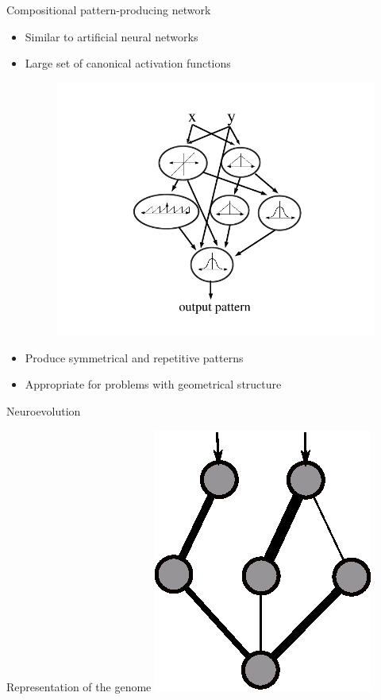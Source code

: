 \documentclass[6pt]{beamer}
\begin{document}
\begin{frame}{Compositional pattern-producing network~}
\begin{itemize}
\item Similar to artificial neural networks
\item Large set of canonical activation functions
\begin{figure}
\begin{center}
\includegraphics[scale=0.25]{../Figures/Misc/cppnNetwork.png}
\end{center}
\end{figure}
\item Produce symmetrical and repetitive patterns
\item Appropriate for problems with geometrical structure
\end{itemize}
\end{frame}

\begin{frame}{Neuroevolution}
\begin{block}{Representation of the genome}
\centering
\includegraphics[height=0.7\textheight]{../Figures/Misc/networksMutationWeights1.eps}
\end{block}
\end{frame}
\end{document}
